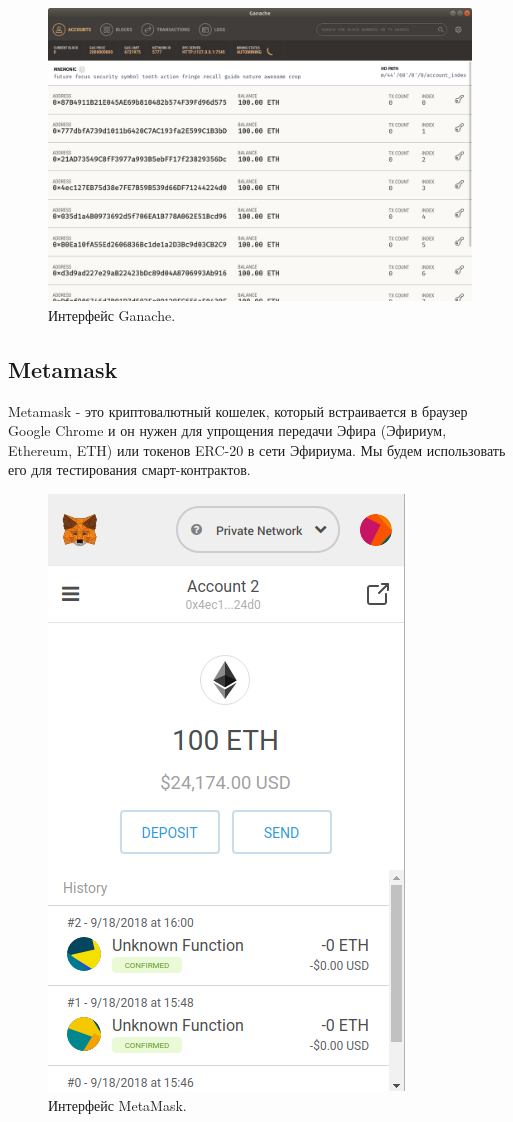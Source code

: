 \documentclass{article}
\begin{document}
\begin{figure}
    \centering
    \includegraphics[scale=0.4]{ganache_1}
    \caption{Интерфейс Ganache.}
    \label{fig:ganache_1}
\end{figure}

\subsection{Metamask}

Metamask -  это криптовалютный кошелек, который встраивается в браузер Google Chrome и он нужен для упрощения передачи Эфира (Эфириум,  Ethereum, ETH)  или токенов ERC-20  в сети Эфириума. Мы будем использовать его для тестирования смарт-контрактов.


\begin{figure}
    \centering
    \includegraphics[scale=0.4]{metamask_1}
    \caption{Интерфейс MetaMask.}
    \label{fig:metamask_1}
\end{figure}
\end{document}

